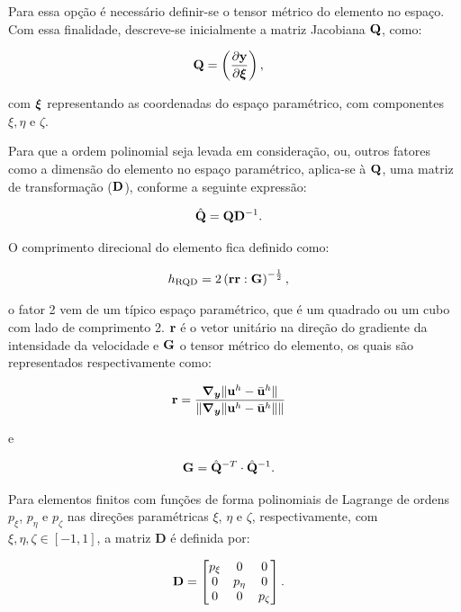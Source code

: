 \documentclass[tese_patricia]{subfiles}%
\begin{document}
Para essa opção é necessário definir-se o tensor métrico do elemento no espaço. Com essa finalidade, descreve-se inicialmente a matriz Jacobiana $\mathbf{Q}$, como:

\begin{align}
	\mathbf{Q}&=\left(\frac{\partial\mathbf{y}}{\partial\bm{\xi}}\right),
\end{align}

\noindent com $\bm{\xi}$ representando as coordenadas do espaço paramétrico, com componentes $\xi, \eta$ e $\zeta$.

Para que a ordem polinomial seja levada em consideração, ou, outros fatores como a dimensão do elemento no espaço paramétrico, aplica-se à $\mathbf{Q}$, uma matriz de transformação ($\mathbf{D}$), conforme a seguinte expressão:

\begin{align}
	\hat{\mathbf{Q}}&=\mathbf{Q}\mathbf{D}^{-1} \label{eq:q_chap}.
\end{align}

O comprimento direcional do elemento fica definido como:

\begin{align}
	h_{\mathrm{RQD}} &=2\left(\mathbf{r}\mathbf{r} : \mathbf{G} \right)^{-\frac{1}{2}},
\end{align}

\noindent o fator 2 vem de um típico espaço paramétrico, que é um quadrado ou um cubo com lado de comprimento 2. $\mathbf{r}$ é o vetor unitário na direção do gradiente da intensidade da velocidade e $\mathbf{G}$ o tensor métrico do elemento, os quais são representados respectivamente como:

\begin{align}
	\mathbf{r}&=\frac{\boldsymbol{\nabla_y} \lVert\mathbf{u}^h - \bar{\mathbf{u}}^h\rVert}{\lVert \boldsymbol{\nabla_y} \lVert\mathbf{u}^h - \bar{\mathbf{u}}^h\rVert\rVert} \label{eq:rRGN}
\end{align}

\noindent e

\begin{align}
	\mathbf{G} &= \hat{\mathbf{Q}}^{-T} \cdot \hat{\mathbf{Q}}^{-1}. \label{eq:tensor_metrico}
\end{align}

Para elementos finitos com funções de forma polinomiais de Lagrange de ordens $p_\xi$, $p_\eta$ e $p_\zeta$ nas direções paramétricas $\xi$, $\eta$ e $\zeta$, respectivamente, com $\xi, \eta, \zeta \in [-1, 1]$, a matriz $\mathbf{D}$ é definida por:

\begin{align}
	\mathbf{D}&=\begin{bmatrix}
		p_{\xi} & 0 & 0\\
		0 & p_{\eta} & 0 \\
		0 & 0 & p_{\zeta}
	\end{bmatrix}.
\end{align}
\end{document}
